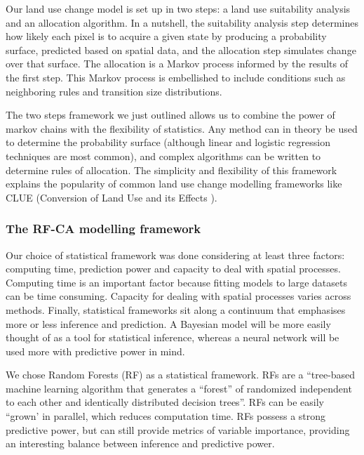 Our land use change model is set up in two steps: a land use suitability analysis and an allocation algorithm. In a nutshell, the suitability analysis step determines how likely each pixel is to acquire a given state by producing a probability surface, predicted based on spatial data, and the allocation step simulates change over that surface. The allocation is a Markov process informed by the results of the first step. This Markov process is embellished to include conditions such as neighboring rules and transition size distributions.

The two steps framework we just outlined allows us to combine the power of markov chains with the flexibility of statistics. Any method can in theory be used to determine the probability surface (although linear and logistic regression techniques are most common), and complex algorithms can be written to determine rules of allocation. The simplicity and flexibility of this framework explains the popularity of common land use change modelling frameworks like CLUE  (Conversion of Land Use and its Effects \cite{verburg_modeling_2002, verburg_combining_2009}). \\

\subsubsection{The RF-CA modelling framework}

Our choice of statistical framework was done considering at least three factors: computing time, prediction power and capacity to deal with spatial processes. Computing time is an important factor because fitting models to large datasets can be time consuming. Capacity for dealing with spatial processes varies across methods. Finally, statistical frameworks sit along a continuum that emphasises more or less inference and prediction. A Bayesian model will be more easily thought of as a tool for statistical inference, whereas a neural network will be used more with predictive power in mind.

We chose Random Forests (RF) as a statistical framework. RFs are a “tree-based machine learning algorithm that generates a “forest” of randomized independent to each other and identically distributed decision trees”. RFs can be easily “grown’ in parallel, which reduces computation time. RFs possess a strong predictive power, but can still provide metrics of variable importance, providing an interesting balance between inference and predictive power.

